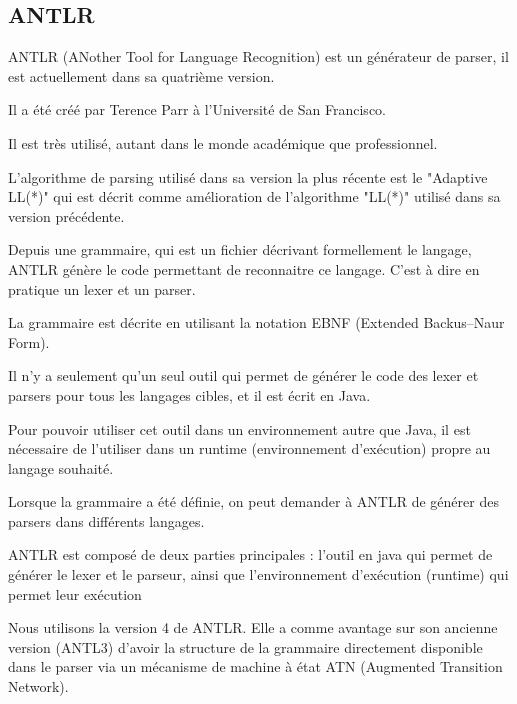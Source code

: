 \documentclass[
    iict, %
    il, %
]{heig-tb}
\begin{document}
\subsection{ANTLR}

ANTLR (ANother Tool for Language Recognition) est un générateur de parser, il est actuellement dans sa quatrième version.

Il a été créé par Terence Parr à l'Université de San Francisco.

Il est très utilisé, autant dans le monde académique que professionnel.

L'algorithme de parsing utilisé dans sa version la plus récente est le "Adaptive LL(*)" qui est décrit comme amélioration de l'algorithme
"LL(*)" utilisé dans sa version précédente.


Depuis une grammaire, qui est un fichier décrivant formellement le langage, ANTLR génère le code permettant de reconnaitre ce langage.
C'est à dire en pratique un lexer et un parser. %

La grammaire est décrite en utilisant la notation EBNF (Extended Backus–Naur Form).

Il n'y a seulement qu'un seul outil qui permet de générer le code des lexer et parsers pour tous les langages cibles, et il est écrit en Java.

Pour pouvoir utiliser cet outil dans un environnement autre que Java, il est nécessaire de l'utiliser dans un runtime (environnement d'exécution) propre au langage souhaité.

Lorsque la grammaire a été définie, on peut demander à ANTLR de générer des parsers dans différents langages.

ANTLR est composé de deux parties principales : l'outil en java qui permet de générer le lexer et le parseur, ainsi que l'environnement d'exécution (runtime) qui permet leur exécution


Nous utilisons la version 4 de ANTLR. Elle a comme avantage sur son ancienne version (ANTL3) d'avoir la structure de la grammaire directement disponible dans le parser via
un mécanisme de machine à état ATN (Augmented Transition Network).
\end{document}
